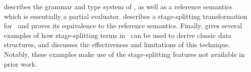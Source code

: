 \documentclass[preprint]{sigplanconf}
\begin{document}
 describes the grammar and type system of \lang, as well as a reference semantics which is essentially a partial evaluator.  describes a stage-splitting transformation for \lang\ and proves its equivalence to the reference semantics.
Finally,  gives several examples of how stage-splitting terms in \lang\ can be used to derive classic data structures, and discusses the effectiveness and limitations of this technique.  Notably, these examples make use of the stage-splitting features not available in prior work.










\end{document}
